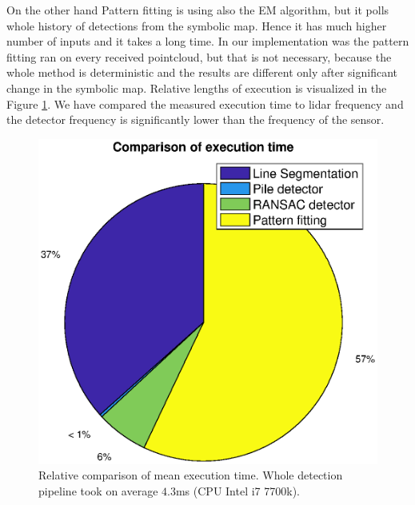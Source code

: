 On the other hand Pattern fitting is using also the EM algorithm, but it polls whole history of detections from the symbolic map. Hence it has much higher number of inputs and it takes a long time. In our implementation was the pattern fitting ran on every received pointcloud, but that is not necessary, because the whole method is deterministic and the results are different only after significant change in the symbolic map. Relative lengths of execution is visualized in the Figure \ref{fig:time}. We have compared the measured execution time to lidar frequency and the detector frequency is significantly lower than the frequency of the sensor.
\begin{figure}[H]
	\centering
	\includegraphics[scale=0.55]{fig/time.eps}
	\caption[Experiment results]{Relative comparison of mean execution time. Whole detection pipeline took on average $4.3$ms (CPU Intel i7 7700k).}
	\label{fig:time}
\end{figure}

